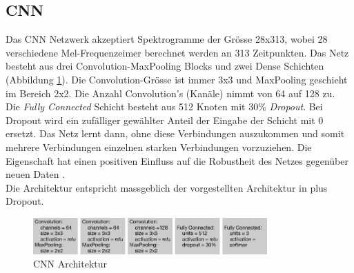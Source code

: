 \subsection{CNN}
Das CNN Netzwerk akzeptiert Spektrogramme der Grösse 28x313, wobei 28 verschiedene Mel-Frequenzeimer berechnet werden an 313 Zeitpunkten. Das Netz besteht aus drei Convolution-MaxPooling Blocks und zwei Dense Schichten (Abbildung \ref{img:cnn}). Die Convolution-Grösse ist immer 3x3 und MaxPooling geschieht im Bereich 2x2. Die Anzahl Convolution's (Kanäle) nimmt von 64 auf 128 zu. 
\\
Die \textit{Fully Connected} Schicht besteht aus 512 Knoten mit 30\% \textit{Dropout}. Bei Dropout wird ein zufälliger gewählter Anteil der Eingabe der Schicht mit 0 ersetzt. Das Netz lernt dann, ohne diese Verbindungen auszukommen und somit mehrere Verbindungen einzelnen starken Verbindungen vorzuziehen. Die Eigenschaft hat einen positiven Einfluss auf die Robustheit des Netzes gegenüber neuen Daten \parencite[][Kap. 4.4.3]{chollet}.
\\
Die Architektur entspricht massgeblich der vorgestellten Architektur in \parencite{iLID} plus Dropout.
 \begin{figure}[hbt]
	\centering
		\includegraphics[width=0.8\textwidth]{assets/cnn.png}
	\caption{CNN Architektur}
	\label{img:cnn}
\end{figure}

